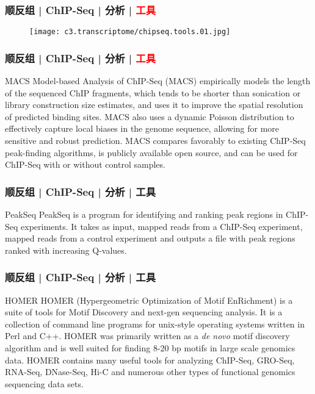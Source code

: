 \begin{frame}
  \frametitle{顺反组 | ChIP-Seq | 分析 | \textcolor{red}{工具}}
  \begin{figure}
    \centering
    \texttt{[image: c3.transcriptome/chipseq.tools.01.jpg]}
  \end{figure}
\end{frame}

\begin{frame}
  \frametitle{顺反组 | ChIP-Seq | 分析 | \textcolor{red}{工具}}
  \begin{block}{MACS}
    Model-based Analysis of ChIP-Seq (MACS) empirically models the length of the sequenced ChIP fragments, which tends to be shorter than sonication or library construction size estimates, and uses it to improve the spatial resolution of predicted binding sites. MACS also uses a dynamic Poisson distribution to effectively capture local biases in the genome sequence, allowing for more sensitive and robust prediction. MACS compares favorably to existing ChIP-Seq peak-finding algorithms, is publicly available open source, and can be used for ChIP-Seq with or without control samples.
  \end{block}
\end{frame}

\begin{frame}
  \frametitle{顺反组 | ChIP-Seq | 分析 | 工具}
  \begin{block}{PeakSeq}
    PeakSeq is a program for identifying and ranking peak regions in ChIP-Seq experiments. It takes as input, mapped reads from a ChIP-Seq experiment, mapped reads from a control experiment and outputs a file with peak regions ranked with increasing Q-values. 
  \end{block}
\end{frame}

\begin{frame}
  \frametitle{顺反组 | ChIP-Seq | 分析 | 工具}
  \begin{block}{HOMER}
    HOMER (Hypergeometric Optimization of Motif EnRichment) is a suite of tools for Motif Discovery and next-gen sequencing analysis.  It is a collection of command line programs for unix-style operating systems written in Perl and C++. HOMER was primarily written as a \textit{de novo} motif discovery algorithm and is well suited for finding 8-20 bp motifs in large scale genomics data.  HOMER contains many useful tools for analyzing ChIP-Seq, GRO-Seq, RNA-Seq, DNase-Seq, Hi-C and numerous other types of functional genomics sequencing data sets.
  \end{block}
\end{frame}

